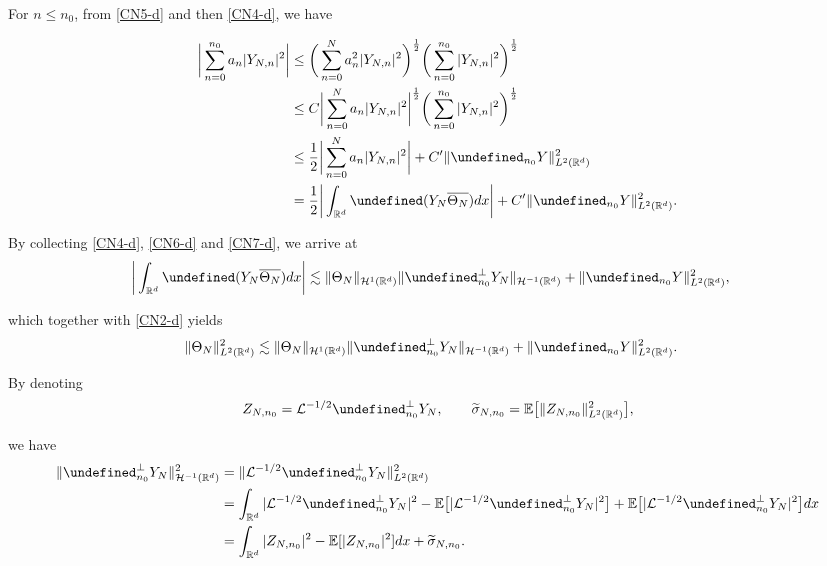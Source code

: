 \documentclass[%
11pt,  reqno]{amsart}
\theoremstyle{remarkstyle}
\newcommand{\1}{\hspace{0.2mm}\text{I}\hspace{0.2mm}}
\newcommand{\noi}{\noindent}
\newcommand{\R}{\mathbb{R}}
\let\Re=\undefined\DeclareMathOperator*{\Re}{Re}
\let\P= \undefined
\newcommand{\P}{\mathbf{P}}
\newcommand{\E}{\mathbb{E}}
\renewcommand{\L}{\mathcal{L}}
\newcommand{\s}{\sigma}
\newcommand{\wt}{\widetilde}
\newcommand{\les}{\lesssim}
\numberwithin{equation}{section}
\numberwithin{theorem}{section}
\begin{document}
	\noi 
	For $n \le n_0$, from \eqref{CN5-d} and then \eqref{CN4-d},
	we have
	
	\begin{align}
		\begin{split}
			\bigg| \sum_{n=0}^{n_0} a_n |Y_{N,n}|^2 \bigg| 
			& \le \bigg( \sum_{n=0}^N a_n^2 |Y_{N,n}|^2\bigg)^{\frac12} \bigg( \sum_{n=0}^{n_0} |Y_{N,n}|^2\bigg)^{\frac12} \\
			& \le C \bigg| \sum_{n=0}^N  a_n |Y_{N,n}|^2\bigg|^{\frac12} \bigg( \sum_{n=0}^{n_0} |Y_{N,n}|^2\bigg)^{\frac12} \\
			& \le \frac12 \bigg| \sum_{n=0}^N  a_n |Y_{N,n}|^2\bigg| + C' \| \P_{n_0} Y \|_{L^2(\R^d)}^2\\
			& = \frac12 \bigg| \int_{\R^d} \Re(Y_N \overline{\Theta_N}) dx \bigg| + C' \| \P_{n_0} Y \|_{L^2(\R^d)}^2.
		\end{split}
		\label{CN7-d}
	\end{align}
	
	\noi 
	By collecting \eqref{CN4-d}, \eqref{CN6-d} and \eqref{CN7-d}, we arrive at
	\begin{align*}  
		\bigg| \int_{\R^d} \Re(Y_N \overline{\Theta_N}) dx \bigg|  & \les \| \Theta_N \|_{\mathcal H^1(\R^d)} \| \P^{\perp}_{n_0} Y_N \|_{\mathcal H^{-1}(\R^d)} +  \| \P_{ n_0} Y \|_{L^2(\R^d)}^2 , 
	\end{align*}
	
	\noi 
	which together with \eqref{CN2-d} yields
	\begin{align}
		\label{CN8-d}
		\| \Theta_N\|_{L^2(\R^d)}^2  & \les \| \Theta_N \|_{\mathcal H^1(\R^d)} \| \P^\perp_{n_0} Y_N \|_{\mathcal H^{-1}(\R^d)} +  \| \P_{n_0} Y \|_{L^2(\R^d)}^2 .
	\end{align}
	
	By denoting
	\[
	Z_{N,n_0} = \L^{-1/2} \P^\perp_{n_0} Y_N, \qquad \wt \s_{N,n_0} =  \E \big[\| Z_{N,n_0} \|_{L^2(\R^d)}^2 \big] ,
	\]
	
	\noi 
	we have
	\begin{align}
		\label{B0e-d}
		\begin{split}
			\|\P^\perp_{n_0} Y_N \|_{\mathcal H^{-1}(\R^d)}^2 
			& = \|\L^{-1/2} \P^{\perp}_{n_0} Y_N\|_{L^2(\R^d)}^2 \\
			& =   \int_{\R^d} |\L^{-1/2} \P^\perp_{n_0} Y_N|^2 - \E\big[|\L^{-1/2} \P^\perp_{n_0} Y_N|^2 \big] + \E\big[|\L^{-1/2} \P^\perp_{n_0} Y_N|^2 \big] dx  \\
			& = \int_{\R^d} |Z_{N,n_0}|^2- \E[|Z_{N,n_0}|^2] dx  + \wt \s_{N,n_0}.
		\end{split}
	\end{align}
	
\end{document}
